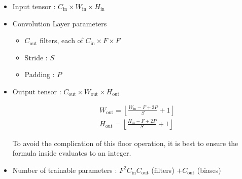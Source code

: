 \begin{concept}
    \begin{itemize}
        \item Input tensor : $C_{\text {in}} \times W_{\text {in}} \times H_{\text {in}}$
        \item
        Convolution Layer parameters

        \begin{itemize}
            \item $C_{\text {out}}$ filters, each of $C_{\text {in}} \times F \times F$
            \item Stride : $S$
            \item Padding : $P$
        \end{itemize}
        \item
        Output tensor : $C_{\text {out}} \times W_{\text {out}} \times H_{\text {out}}$

        $$
        \begin{aligned}
        & W_{\text{out}}=\left\lfloor\frac{W_{\text{in}}-F+2 P}{S}+1\right\rfloor \\
        & H_{\text{out}}=\left\lfloor\frac{H_{\text{in}}-F+2 P}{S}+1\right\rfloor
        \end{aligned}
        $$

        To avoid the complication of this floor operation, it is best to ensure the formula inside evaluates to an integer.
        \item Number of trainable parameters : $F^2 C_{\text{in}} C_{\text{out}}$ (filters) $+ C_{\text{out}}$ (biases)
    \end{itemize}
\end{concept}

